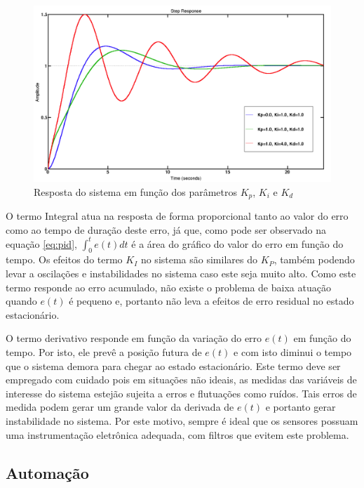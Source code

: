 \begin{figure}[H]
\centering
\includegraphics[width=\textwidth]{Figuras/pid_resposta}
\caption{Resposta do sistema em função dos parâmetros $K_p$, $K_i$ e $K_d$}
\label{fig:pid_respostal}
\end{figure}

O termo Integral atua na resposta de forma proporcional tanto ao valor do erro como ao tempo de duração deste erro, já que, como pode ser observado na equação \ref{eq:pid}, $\int^t_0{e\left(t\right)dt} $  é a área do gráfico do valor do erro em função do tempo. Os efeitos do termo $K_I$ no sistema são similares do $K_P$, também podendo levar a oscilações e instabilidades no sistema caso este seja muito alto. Como este termo responde ao erro acumulado, não existe o problema de baixa atuação quando $e(t)$ é pequeno e, portanto não leva a efeitos de erro residual no estado estacionário.

O termo derivativo responde em função da variação do erro $e(t)$ em função do tempo. Por isto, ele prevê a posição futura de $e(t)$ e com isto diminui o tempo que o sistema demora para chegar ao estado estacionário. Este termo deve ser empregado com cuidado pois em situações não ideais, as medidas das variáveis de interesse do sistema estejão sujeita a erros e flutuações como ruídos. Tais erros de medida podem gerar um grande valor da derivada de $e(t)$ e portanto gerar instabilidade no sistema. Por este motivo, sempre é ideal que os sensores possuam uma instrumentação eletrônica adequada, com filtros que evitem este problema.

\subsection{Automação}

